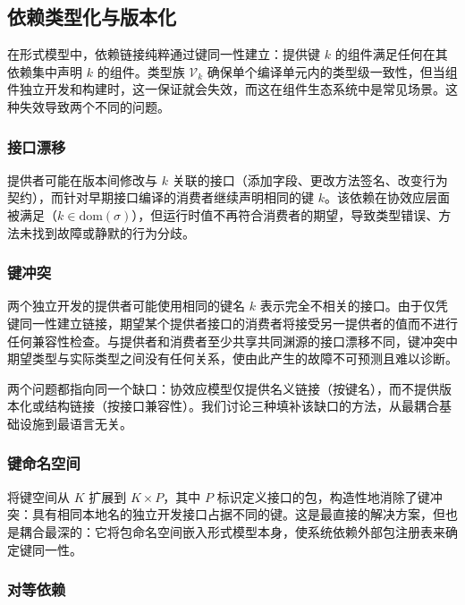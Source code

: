 \subsection{依赖类型化与版本化}\label{sec:6.6}

在形式模型中，依赖链接纯粹通过键同一性建立：提供键 $k$ 的组件满足任何在其依赖集中声明 $k$ 的组件。类型族 $\mathcal{V}_k$ 确保单个编译单元内的类型级一致性，但当组件独立开发和构建时，这一保证就会失效，而这在组件生态系统中是常见场景。这种失效导致两个不同的问题。

\subsubsection{接口漂移}

提供者可能在版本间修改与 $k$ 关联的接口（添加字段、更改方法签名、改变行为契约），而针对早期接口编译的消费者继续声明相同的键 $k$。该依赖在协效应层面被满足（$k \in \mathrm{dom}(\sigma)$），但运行时值不再符合消费者的期望，导致类型错误、方法未找到故障或静默的行为分歧\cite{ref70}。

\subsubsection{键冲突}

两个独立开发的提供者可能使用相同的键名 $k$ 表示完全不相关的接口。由于仅凭键同一性建立链接，期望某个提供者接口的消费者将接受另一提供者的值而不进行任何兼容性检查。与提供者和消费者至少共享共同渊源的接口漂移不同，键冲突中期望类型与实际类型之间没有任何关系，使由此产生的故障不可预测且难以诊断。

两个问题都指向同一个缺口：协效应模型仅提供名义链接（按键名），而不提供版本化或结构链接（按接口兼容性）\cite{ref71}。我们讨论三种填补该缺口的方法，从最耦合基础设施到最语言无关。

\subsubsection{键命名空间}

将键空间从 $K$ 扩展到 $K \times P$，其中 $P$ 标识定义接口的包，构造性地消除了键冲突：具有相同本地名的独立开发接口占据不同的键。这是最直接的解决方案，但也是耦合最深的：它将包命名空间嵌入形式模型本身，使系统依赖外部包注册表来确定键同一性。

\subsubsection{对等依赖}

